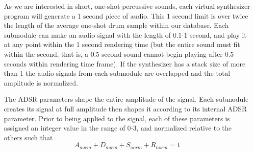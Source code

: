 \documentclass[\main/thesis.tex]{subfiles}
\begin{document}
As we are interested in short, one-shot percussive sounds, each virtual synthesizer program will generate a 1 second piece of audio. This 1 second limit is over twice the length of the average one-shot drum sample within our database. Each submodule can make an audio signal with the length of 0.1-1 second, and play it at any point within the 1 second rendering time (but the entire sound must fit within the second, that is, a 0.5 second sound cannot begin playing after 0.5 seconds within rendering time frame). If the synthesizer has a stack size of more than 1 the audio signals from each submodule are overlapped and the total amplitude is normalized.

\begin{table}[t!]
\centering
{}
\caption{Synthesizer submodule Parameters. Despite the simplicity of the parameters and our efforts at constraining the ranges, the number of parameters that can be randomly chosen for each submodule is in the order of $10^{15}$ }
\label{table:submodule_params}
\end{table}
The ADSR parameters shape the entire amplitude of the signal. Each submodule creates its signal at full amplitude then shapes it according to its internal ADSR parameter. Prior to being applied to the signal, each of these parameters is assigned an integer value in the range of 0-3, and normalized relative to the others such that \[ A_{norm} + D_{norm} + S_{norm} + R_{norm} = 1 \] \\ 
\end{document}
